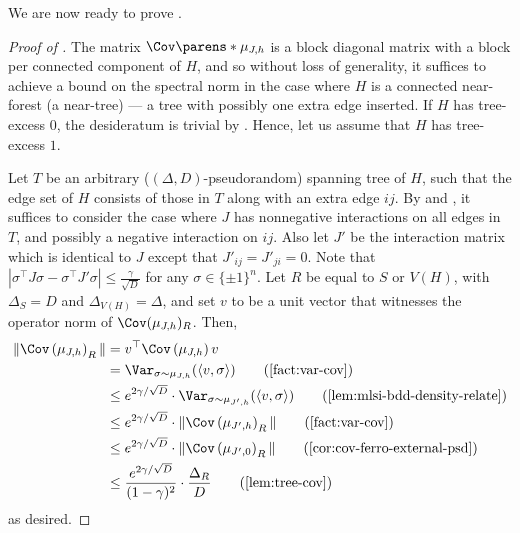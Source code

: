 \documentclass[11pt,letterpaper]{article}
\begin{document}
    We are now ready to prove .
    \begin{proof}[Proof of ]
        The matrix $\Cov\parens*{\mu_{J,h}}$ is a block diagonal matrix with a block per connected component of $H$, and so without loss of generality, it suffices to achieve a bound on the spectral norm in the case where $H$ is a connected near-forest (a near-tree) --- a tree with possibly one extra edge inserted. If $H$ has tree-excess $0$, the desideratum is trivial by .
        Hence, let us assume that $H$ has tree-excess $1$.

        Let $T$ be an arbitrary ($(\Delta,D)$-pseudorandom) spanning tree of $H$, such that the edge set of $H$ consists of those in $T$ along with an extra edge $ij$. By  and , it suffices to consider the case where $J$ has nonnegative interactions on all edges in $T$, and possibly a negative interaction on $ij$. Also let $J'$ be the interaction matrix which is identical to $J$ except that $J'_{ij} =J'_{ji} = 0$. Note that $\left|\sigma^\top J \sigma - \sigma^\top J' \sigma\right| \le \frac{\gamma}{\sqrt{D}}$ for any $\sigma \in \{\pm 1\}^n$. Let $R$ be equal to $S$ or $V(H)$, with $\Delta_S = D$ and $\Delta_{V(H)} = \Delta$, and set $v$ to be a unit vector that witnesses the operator norm of $\Cov(\mu_{J,h})_{R}$. Then,
        \begin{align*}
            \|\Cov\left( \mu_{J,h} \right)_R\| &= v^\top \Cov\left( \mu_{J,h} \right) v  \\
            &= \Var_{\sigma \sim \mu_{J,h}}(\langle v,\sigma\rangle) \tag*{(\text{\Cref{fact:var-cov}})} \\
            &\le e^{2\gamma/\sqrt{D}} \cdot \Var_{\sigma \sim \mu_{J',h}} (\langle v,\sigma\rangle) \tag*{(\text{\Cref{lem:mlsi-bdd-density-relate}})} \\
            &\le e^{2\gamma/\sqrt{D}} \cdot \| \Cov\left( \mu_{J',h} \right)_R \| \tag*{(\text{\Cref{fact:var-cov}})} \\
            &\le e^{2\gamma/\sqrt{D}} \cdot \| \Cov\left( \mu_{J',0} \right)_R \| \tag*{(\text{\Cref{cor:cov-ferro-external-psd}})} \\
            &\le \frac{e^{2\gamma/\sqrt{D}}}{(1-\gamma)^2} \cdot \frac{\Delta_R}{D} \tag*{(\text{\Cref{lem:tree-cov}})}
        \end{align*}
        as desired.
    \end{proof}
\end{document}
